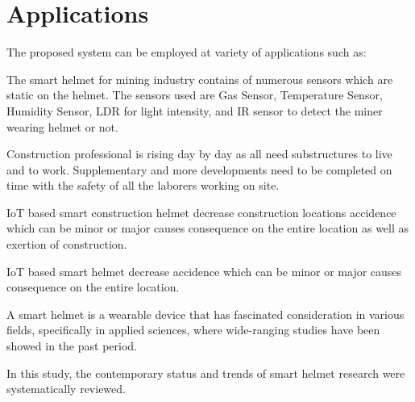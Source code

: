 \documentclass[12pt,a4paper]{report}
\begin{document}
\section{Applications }

\noindent The proposed system can be employed at variety of applications such as:

\noindent 
\newline
\noindent
\newline
{}

\noindent The smart helmet for mining industry contains of numerous sensors which are static on the helmet. The sensors used are Gas Sensor, Temperature Sensor, Humidity Sensor, LDR for light intensity, and IR sensor to detect the miner wearing helmet or not.

\noindent 
\newline
\noindent
\newline
{}

\noindent Construction professional is rising day by day as all need substructures to live and to work. Supplementary and more developments need to be completed on time with the safety of all the laborers working on site.

\noindent  IoT based smart construction helmet decrease construction locations accidence which can be minor or major causes consequence on the entire location as well as exertion of construction.

\noindent 

\noindent 
\newline
\noindent
\newline
{}

\noindent IoT based smart helmet decrease  accidence which can be minor or major causes consequence on the entire location.

\noindent 

\noindent 
\newline
\noindent
\newline
{}

\noindent A smart helmet is a wearable device that has fascinated consideration in various fields, specifically in applied sciences, where wide-ranging studies have been showed in the past period. 

\noindent In this study, the contemporary status and trends of smart helmet research were systematically reviewed. 

\noindent 
\end{document}
